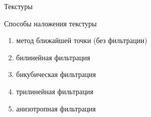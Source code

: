\documentclass{beamer}
\begin{document}
	\begin{frame}{Текстуры}

		Способы наложения текстуры 
		\begin{enumerate}
			\item метод ближайшей точки (без фильтрации)
			\item билинейная фильтрация 
			\item бикубическая фильтрация
			\item трилинейная фильтрация 
			\item анизотропная фильтрация 
		\end{enumerate}

	\end{frame}
\end{document}
